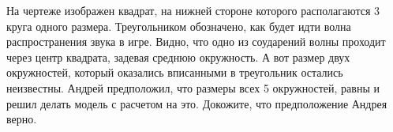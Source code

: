 \begin{figure}[h]
\begin{minipage}[h]{0.49\linewidth}
    \end{minipage}
    
\end{figure}

На чертеже изображен квадрат, на нижней стороне которого располагаются 3 круга одного размера. Треугольником обозначено, как будет идти волна распространения звука в игре. Видно, что одно из соударений волны проходит через центр квадрата, задевая среднюю окружность. А вот размер двух окружностей, который оказались вписанными в треугольник остались неизвестны. 
Андрей предположил, что размеры всех 5 окружностей, равны и решил делать модель с расчетом на это. Докожите, что предположение Андрея верно.\\